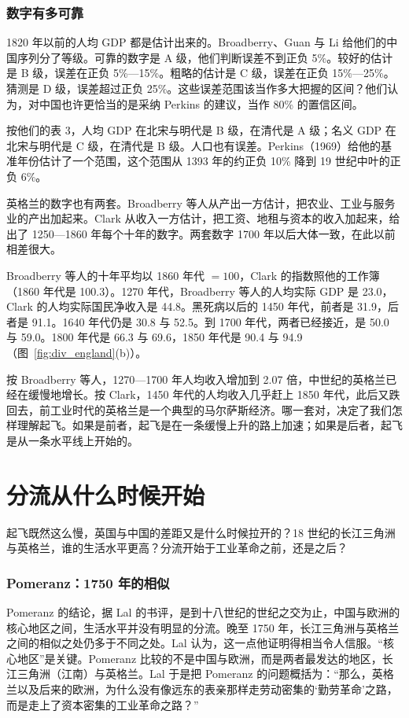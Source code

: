 \subsubsection{数字有多可靠}
1820 年以前的人均 GDP 都是估计出来的。Broadberry、Guan 与 Li 给他们的中国序列分了等级。可靠的数字是 A 级，他们判断误差不到正负 5\%。较好的估计是 B 级，误差在正负 5\%—15\%。粗略的估计是 C 级，误差在正负 15\%—25\%。猜测是 D 级，误差超过正负 25\%\cite{bgl2017}。这些误差范围该当作多大把握的区间？他们认为，对中国也许更恰当的是采纳 Perkins 的建议，当作 80\% 的置信区间\cite{bgl2017}。

按他们的表 3，人均 GDP 在北宋与明代是 B 级，在清代是 A 级；名义 GDP 在北宋与明代是 C 级，在清代是 B 级\cite{bgl2017}。人口也有误差。Perkins（1969）给他的基准年份估计了一个范围，这个范围从 1393 年的约正负 10\% 降到 19 世纪中叶的正负 6\%\cite{bgl2017}。

英格兰的数字也有两套。Broadberry 等人从产出一方估计，把农业、工业与服务业的产出加起来。Clark 从收入一方估计，把工资、地租与资本的收入加起来，给出了 1250—1860 年每个十年的数字\cite{broadberry2015,clark2010}。两套数字 1700 年以后大体一致，在此以前相差很大。

Broadberry 等人的十年平均以 1860 年代 $=100$，Clark 的指数照他的工作簿（1860 年代是 100.3）。1270 年代，Broadberry 等人的人均实际 GDP 是 23.0，Clark 的人均实际国民净收入是 44.8。黑死病以后的 1450 年代，前者是 31.9，后者是 91.1。1640 年代仍是 30.8 与 52.5。到 1700 年代，两者已经接近，是 50.0 与 59.0。1800 年代是 66.3 与 69.6，1850 年代是 90.4 与 94.9（图~\ref{fig:div_england}(b)）。

按 Broadberry 等人，1270—1700 年人均收入增加到 2.07 倍，中世纪的英格兰已经在缓慢地增长。按 Clark，1450 年代的人均收入几乎赶上 1850 年代，此后又跌回去，前工业时代的英格兰是一个典型的马尔萨斯经济。哪一套对，决定了我们怎样理解起飞。如果是前者，起飞是在一条缓慢上升的路上加速；如果是后者，起飞是从一条水平线上开始的。

\section{分流从什么时候开始}\label{sec:divergence-when}

起飞既然这么慢，英国与中国的差距又是什么时候拉开的？18 世纪的长江三角洲与英格兰，谁的生活水平更高？分流开始于工业革命之前，还是之后？

\subsubsection{Pomeranz：1750 年的相似}
Pomeranz 的结论，据 Lal 的书评，是到十八世纪的世纪之交为止，中国与欧洲的核心地区之间，生活水平并没有明显的分流。晚至 1750 年，长江三角洲与英格兰之间的相似之处仍多于不同之处\cite{pomeranz2000,lal2000}。Lal 认为，这一点他证明得相当令人信服。“核心地区”是关键。Pomeranz 比较的不是中国与欧洲，而是两者最发达的地区，长江三角洲（江南）与英格兰。Lal 于是把 Pomeranz 的问题概括为：“那么，英格兰以及后来的欧洲，为什么没有像远东的表亲那样走劳动密集的‘勤劳革命’之路，而是走上了资本密集的工业革命之路？”\cite{lal2000}

